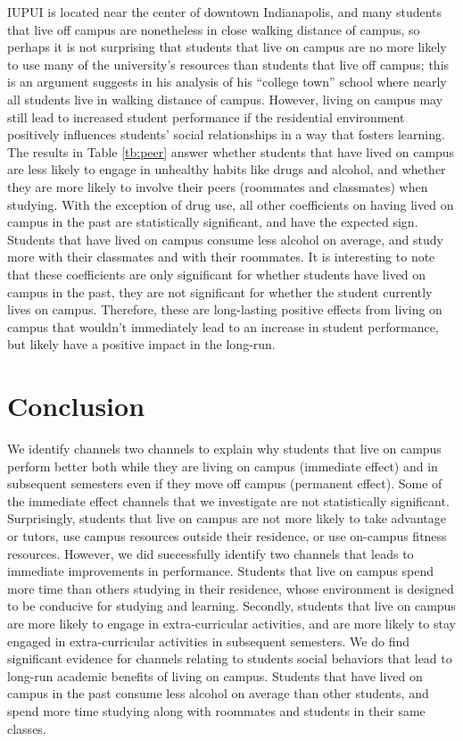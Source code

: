 \documentclass[10pt]{article}
\newcommand{\citee}[1]{\citename{#1} \citeyear{#1}}
\begin{document}
IUPUI is located near the center of downtown Indianapolis, and many students that live off campus are nonetheless in close walking distance of campus, so perhaps it is not surprising that students that live on campus are no more likely to use many of the university's resources than students that live off campus; this is an argument \citee{delucchi1993} suggests in his analysis of his ``college town'' school where nearly all students live in walking distance of campus.  However, living on campus may still lead to increased student performance if the residential environment positively influences students' social relationships in a way that fosters learning.  The results in Table \ref{tb:peer} answer whether students that have lived on campus are less likely to engage in unhealthy habits like drugs and alcohol, and whether they are more likely to involve their peers (roommates and classmates) when studying.  With the exception of drug use, all other coefficients on having lived on campus in the past are statistically significant, and have the expected sign.  Students that have lived on campus consume less alcohol on average, and study more with their classmates and with their roommates.  It is interesting to note that these coefficients are only significant for whether students have lived on campus in the past, they are not significant for whether the student currently lives on campus.  Therefore, these are long-lasting positive effects from living on campus that wouldn't immediately lead to an increase in student performance, but likely have a positive impact in the long-run.

\section{Conclusion}
We identify channels two channels to explain why students that live on campus perform better both while they are living on campus (immediate effect) and in subsequent semesters even if they move off campus (permanent effect).  Some of the immediate effect channels that we investigate are not statistically significant.  Surprisingly, students that live on campus are not more likely to take advantage or tutors, use campus resources outside their residence, or use on-campus fitness resources.  However, we did successfully identify two channels that leads to immediate improvements in performance.  Students that live on campus spend more time than others studying in their residence, whose environment is designed to be conducive for studying and learning.  Secondly, students that live on campus are more likely to engage in extra-curricular activities, and are more likely to stay engaged in extra-curricular activities in subsequent semesters.  We do find significant evidence for channels relating to students social behaviors that lead to long-run academic benefits of living on campus.  Students that have lived on campus in the past consume less alcohol on average than other students, and spend more time studying along with roommates and students in their same classes.
\end{document}
